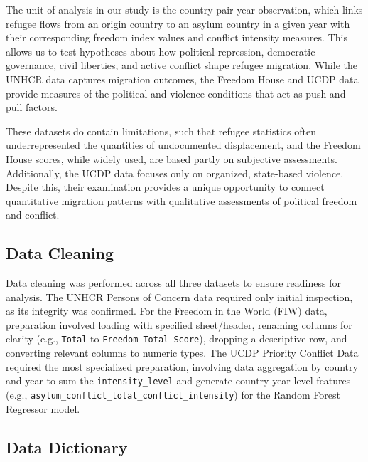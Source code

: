 \documentclass{article}
\theoremstyle{plain}
\theoremstyle{definition}
\theoremstyle{remark}
\begin{document}
The unit of analysis in our study is the country-pair-year observation, which links refugee flows from an origin country to an asylum country in a given year with their corresponding freedom index values and conflict intensity measures. This allows us to test hypotheses about how political repression, democratic governance, civil liberties, and active conflict shape refugee migration. While the UNHCR data captures migration outcomes, the Freedom House and UCDP data provide measures of the political and violence conditions that act as push and pull factors.

These datasets do contain limitations, such that refugee statistics often underrepresented the quantities of undocumented displacement, and the Freedom House scores, while widely used, are based partly on subjective assessments. Additionally, the UCDP data focuses only on organized, state-based violence. Despite this, their examination provides a unique opportunity to connect quantitative migration patterns with qualitative assessments of political freedom and conflict.


\subsection{Data Cleaning}
Data cleaning was performed across all three datasets to ensure readiness for analysis. The UNHCR Persons of Concern data required only initial inspection, as its integrity was confirmed. For the Freedom in the World (FIW) data, preparation involved loading with specified sheet/header, renaming columns for clarity (e.g., \texttt{Total} to \texttt{Freedom Total Score}), dropping a descriptive row, and converting relevant columns to numeric types. The UCDP Priority Conflict Data required the most specialized preparation, involving data aggregation by country and year to sum the \texttt{intensity\_level} and generate country-year level features (e.g., \texttt{asylum\_conflict\_total\_conflict\_intensity}) for the Random Forest Regressor model.

\subsection{Data Dictionary}
\end{document}
